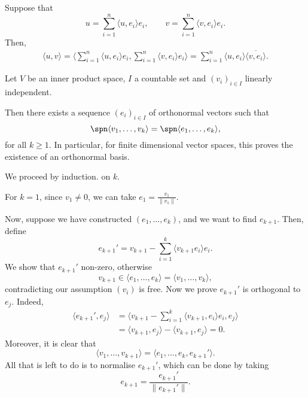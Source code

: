 \documentclass[12pt]{article}
\begin{document}
\begin{proofbox}
	Suppose that
	\[
	u = \sum_{i = 1}^{n} \langle u, e_i \rangle e_i, \qquad v = \sum_{i = 1}^{n} \langle v, e_i \rangle e_i
	.\]
	Then,
	\begin{align*}
		\langle u, v \rangle = \biggl\langle \sum_{i = 1}^{n} \langle u, e_i \rangle e_i, \sum_{i = 1}^{n} \langle v, e_i \rangle e_i \biggr\rangle = \sum_{i = 1}^{n} \langle u, e_i \rangle \overline{\langle v, e_i \rangle}.
	\end{align*}
\end{proofbox}

\begin{theorem}
	Let $V$ be an inner product space, $I$ a countable set and $(v_i)_{i \in I}$ linearly independent.

	Then there exists a sequence $(e_i)_{i \in I}$ of orthonormal vectors such that
	\[
	\spn \langle v_1, \ldots, v_k \rangle = \spn \langle e_1, \ldots, e_k \rangle
	,\]
	for all $k \geq 1$. In particular, for finite dimensional vector spaces, this proves the existence of an orthonormal basis.
\end{theorem}

\begin{proofbox}
	We proceed by induction. on $k$.

	For $k = 1$, since $v_1 \neq 0$, we can take $e_1 = \frac{v_1}{\|v_1\|}$.

	Now, suppose we have constructed $(e_1, \ldots, e_k)$, and we want to find $e_{k+1}$. Then, define
	\[
	e_{k+1}' = v_{k+1} - \sum_{i = 1}^{k}\langle v_{k+1}e_i \rangle e_i
	.\]
	We show that $e_{k+1}'$ non-zero, otherwise
	\[v_{k+1} \in \langle e_1 ,\ldots, e_k \rangle = \langle v_1, \ldots, v_k\rangle,\]
	contradicting our assumption $(v_i)$ is free. Now we prove $e_{k+1}'$ is orthogonal to $e_j$. Indeed,
	\begin{align*}
		\langle e_{k+1}', e_j \rangle &= \biggl\langle v_{k+1} - \sum_{i = 1}^{k} \langle v_{k+1}, e_i \rangle e_i, e_j \biggr\rangle \\
					      &= \langle v_{k+1}, e_j \rangle - \langle v_{k+1}, e_j \rangle = 0.
	\end{align*}
	Moreover, it is clear that
	\[
	\langle v_1, \ldots, v_{k+1} \rangle = \langle e_1, \ldots, e_k, e_{k+1}'\rangle
	.\]
	All that is left to do is to normalise $e_{k+1}'$, which can be done by taking
	\[
	e_{k+1} = \frac{e_{k+1}'}{\|e_{k+1}'\|}
	.\]
\end{proofbox}
\end{document}
